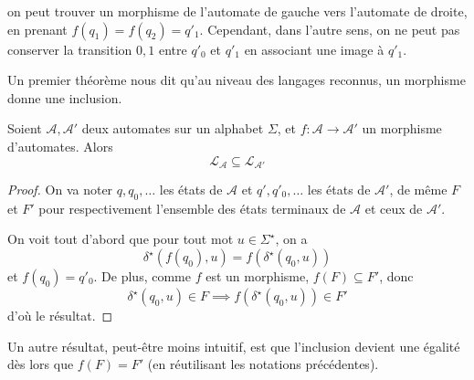 \begin{figure}[H]
  \centering
\end{figure}
on peut trouver un morphisme de l'automate de gauche vers l'automate de droite,
en prenant $f(q_1) = f(q_2) = q'_1$. Cependant, dans l'autre sens, on ne peut
pas conserver la transition $0,1$ entre $q'_0$ et $q'_1$ en associant une image
à $q'_1$.

Un premier théorème nous dit qu'au niveau des langages reconnus, un morphisme
donne une inclusion.

\begin{proposition}
  Soient $\mathcal A, \mathcal A'$ deux automates sur un alphabet $\Sigma$, et
  $f : \mathcal A \to \mathcal A'$ un morphisme d'automates. Alors
  \[\mathcal L_{\mathcal A} \subseteq \mathcal L_{\mathcal A'}\]
\end{proposition}

\begin{proof}
  On va noter $q,q_0,\ldots$ les états de $\mathcal A$ et $q',q'_0,\ldots$ les
  états de $\mathcal A'$, de même $F$ et $F'$ pour respectivement l'ensemble des
  états terminaux de $\mathcal A$ et ceux de $\mathcal A'$.
  
  On voit tout d'abord que pour tout mot $u\in\Sigma^\star$, on a
  \[\delta^\star(f(q_0),u) = f(\delta^\star(q_0,u))\]
  et $f(q_0) = q'_0$. De plus, comme $f$ est un morphisme, $f(F)\subseteq F'$,
  donc
  \[\delta^\star(q_0,u) \in F \implies f(\delta^\star(q_0,u))\in F'\]
  d'où le résultat.
\end{proof}

Un autre résultat, peut-être moins intuitif, est que l'inclusion devient une
égalité dès lors que $f(F) = F'$ (en réutilisant les notations précédentes).

